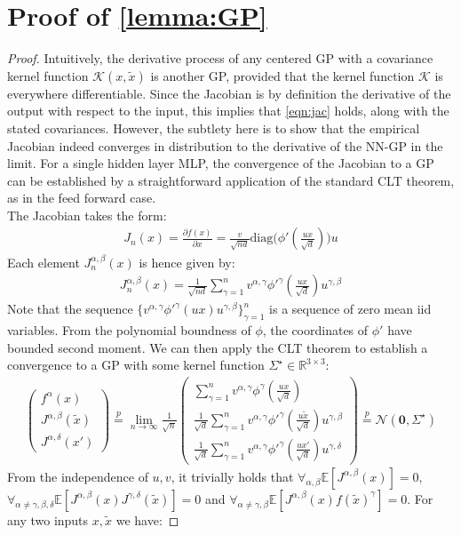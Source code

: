 \documentclass{article}
\theoremstyle{definition}
\theoremstyle{remark}
\renewcommand{\[}{\begin{eqnarray}}
\renewcommand{\]}{\end{eqnarray}}
\renewcommand{\[}{\begin{eqnarray}}
\renewcommand{\]}{\end{eqnarray}}
\newcommand{\R}{\mathbb{R}}
\newcommand{\E}{\mathbb{E}}
\begin{document}
\section{Proof of \cref{lemma:GP}}
\GP*
\begin{proof}
Intuitively, the derivative process of any centered GP with a covariance kernel function $\mathcal{K}(x,\tilde{x})$ is another GP, provided that the kernel function $\mathcal{K}$ is everywhere differentiable. Since the Jacobian is by definition the derivative of the output with respect to the input, this implies that \cref{eqn:jac} holds, along with the stated covariances. However, the subtlety here is to show that the empirical Jacobian indeed converges in distribution to the derivative of the NN-GP in the limit. For a single hidden layer MLP, the convergence of the Jacobian to a GP can be established by a straightforward application of the standard CLT theorem, as in the feed forward case. \\
The Jacobian takes the form:
\[
J_n(x) = \frac{\partial f(x)}{\partial x} = \frac{v}{\sqrt{nd}} \text{diag}\big(\phi'(\frac{ux}{\sqrt{d}})\big)u
\]
Each element $J_n^{\alpha,\beta}(x)$ is hence given by:
\[
J_n^{\alpha,\beta}(x) = \frac{1}{\sqrt{nd}}\sum_{\gamma = 1}^n v^{\alpha,\gamma}\phi'^{\gamma}(\frac{ux}{\sqrt{d}})u^{\gamma,\beta}
\]
Note that the sequence $\{v^{\alpha,\gamma}\phi'^{\gamma}(ux)u^{\gamma,\beta}\}_{\gamma=1}^n$ is a sequence of zero mean iid variables. From the polynomial boundness of $\phi$, the coordinates of $\phi'$ have bounded second moment. We can then apply the CLT theorem to establish a convergence to a GP with some kernel function $\Sigma^\star \in \R^{3 \times 3}$:
\[
\begin{pmatrix}
f^\alpha(x)\\
J^{\alpha,\beta}(\tilde{x})\\
J^{\alpha,\delta}(x')
\end{pmatrix}
\overset{p}{=} \lim_{n \to \infty} \frac{1}{\sqrt{n}}\begin{pmatrix}
\sum_{\gamma=1}^n v^{\alpha,\gamma} \phi^{\gamma}(\frac{ux}{\sqrt{d}})\\
\frac{1}{\sqrt{d}}\sum_{\gamma = 1}^n v^{\alpha,\gamma}\phi'^{\gamma}(\frac{u\tilde{x}}{\sqrt{d}})u^{\gamma,\beta}\\
\frac{1}{\sqrt{d}}\sum_{\gamma = 1}^n v^{\alpha,\gamma}\phi'^{\gamma}(\frac{ux'}{\sqrt{d}})u^{\gamma,\delta}
\end{pmatrix} \overset{p}{=} \mathcal{N}(\bm{0},\Sigma^\star)
\]
From the independence of $u,v$, it trivially holds that $\forall_{\alpha,\beta}\E[J^{\alpha,\beta}(x)] = 0$, $\forall_{\alpha \neq \gamma,\beta,\delta}\E[J^{\alpha,\beta}(x)J^{\gamma,\delta}(\tilde{x})] = 0$ and $\forall_{\alpha \neq \gamma,\beta}\E[J^{\alpha,\beta}(x)f(\tilde{x})^\gamma] = 0$. For any two inputs $x,\tilde{x}$ we have:

\end{proof}
\end{document}
